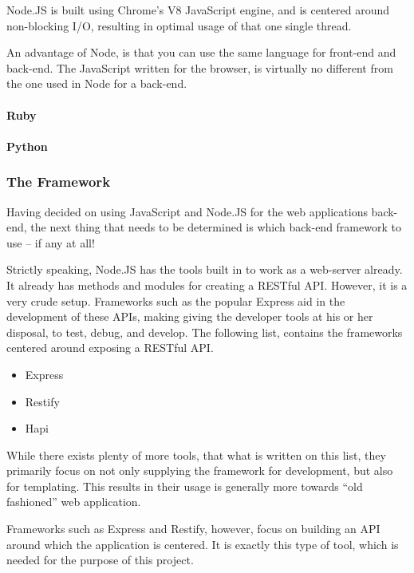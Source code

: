 					Node.JS is built using Chrome's V8 JavaScript engine, and is centered around non-blocking I/O, resulting in optimal usage of that one single thread.

					An advantage of Node, is that you can use the same language for front-end and back-end. The JavaScript written for the browser, is virtually no different from the one used in Node for a back-end. 
				\paragraph{Ruby}
				\paragraph{Python}

			\subsubsection{The Framework}
				Having decided on using JavaScript and Node.JS for the web applications back-end, the next thing that needs to be determined is which back-end framework to use -- if any at all!

				Strictly speaking, Node.JS has the tools built in to work as a web-server already. It already has methods and modules for creating a RESTful API. However, it is a very crude setup. Frameworks such as the popular Express aid in the development of these APIs, making giving the developer tools at his or her disposal, to test, debug, and develop. The following list, contains the frameworks centered around exposing a RESTful API.

				\begin{itemize}
					\item Express
					\item Restify
					\item Hapi
				\end{itemize}

				While there exists plenty of more tools, that what is written on this list, they primarily focus on not only supplying the framework for development, but also for templating. This results in their usage is generally more towards ``old fashioned'' web application.

				Frameworks such as Express and Restify, however, focus on building an API around which the application is centered. It is exactly this type of tool, which is needed for the purpose of this project.

